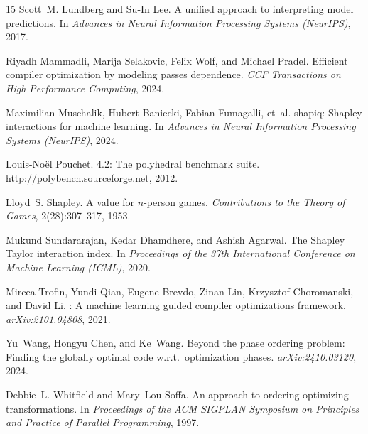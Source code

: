 \documentclass{article}
\begin{document}
\begin{thebibliography}{15}
Scott~M. Lundberg and Su-In Lee.
\newblock A unified approach to interpreting model predictions.
\newblock In \emph{Advances in Neural Information Processing Systems (NeurIPS)}, 2017.

Riyadh Mammadli, Marija Selakovic, Felix Wolf, and Michael Pradel.
\newblock Efficient compiler optimization by modeling passes dependence.
\newblock \emph{CCF Transactions on High Performance Computing}, 2024.

Maximilian Muschalik, Hubert Baniecki, Fabian Fumagalli, et~al.
\newblock shapiq: {Shapley} interactions for machine learning.
\newblock In \emph{Advances in Neural Information Processing Systems (NeurIPS)}, 2024.

Louis-No\"{e}l Pouchet.
 4.2: The polyhedral benchmark suite.
\newblock \url{http://polybench.sourceforge.net}, 2012.

Lloyd~S. Shapley.
\newblock A value for $n$-person games.
\newblock \emph{Contributions to the Theory of Games}, 2(28):307--317, 1953.

Mukund Sundararajan, Kedar Dhamdhere, and Ashish Agarwal.
\newblock The {Shapley Taylor} interaction index.
\newblock In \emph{Proceedings of the 37th International Conference on Machine Learning (ICML)}, 2020.

Mircea Trofin, Yundi Qian, Eugene Brevdo, Zinan Lin, Krzysztof Choromanski, and David Li.
: A machine learning guided compiler optimizations framework.
\newblock \emph{arXiv:2101.04808}, 2021.

Yu~Wang, Hongyu Chen, and Ke~Wang.
\newblock Beyond the phase ordering problem: Finding the globally optimal code w.r.t.\ optimization phases.
\newblock \emph{arXiv:2410.03120}, 2024.

Debbie~L. Whitfield and Mary~Lou Soffa.
\newblock An approach to ordering optimizing transformations.
\newblock In \emph{Proceedings of the ACM SIGPLAN Symposium on Principles and Practice of Parallel Programming}, 1997.

\end{thebibliography}
\end{document}
